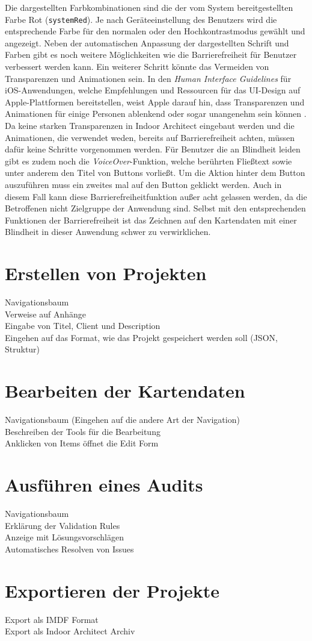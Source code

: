 Die dargestellten Farbkombinationen sind die der vom System bereitgestellten Farbe Rot (\texttt{systemRed}).
Je nach Geräteeinstellung des Benutzers wird die entsprechende Farbe für den normalen oder den Hochkontrastmodus gewählt und angezeigt.\pbreak%
%
Neben der automatischen Anpassung der dargestellten Schrift und Farben gibt es noch weitere Möglichkeiten wie die Barrierefreiheit für Benutzer verbessert werden kann.
Ein weiterer Schritt könnte das Vermeiden von Transparenzen und Animationen sein.
In den \emph{Human Interface Guidelines} für iOS-Anwendungen, welche Empfehlungen und Ressourcen für das UI-Design auf Apple-Plattformen bereitstellen, weist Apple darauf hin, dass Transparenzen und Animationen für einige Personen ablenkend oder sogar unangenehm sein können \parencite{APP2020a}.
Da keine starken Transparenzen in Indoor Architect eingebaut werden und die Animationen, die verwendet weden, bereits auf Barrierefreiheit achten, müssen dafür keine Schritte vorgenommen werden.
Für Benutzer die an Blindheit leiden gibt es zudem noch die \emph{VoiceOver}-Funktion, welche berührten Fließtext sowie unter anderem den Titel von Buttons vorließt.
Um die Aktion hinter dem Button auszuführen muss ein zweites mal auf den Button geklickt werden.
Auch in diesem Fall kann diese Barrierefreiheitfunktion außer acht gelassen werden, da die Betroffenen nicht Zielgruppe der Anwendung sind.
Selbst mit den entsprechenden Funktionen der Barrierefreiheit ist das Zeichnen auf den Kartendaten mit einer Blindheit in dieser Anwendung schwer zu verwirklichen.

\section{Erstellen von Projekten}
Navigationsbaum\\
Verweise auf Anhänge\\
Eingabe von Titel, Client und Description\\
Eingehen auf das Format, wie das Projekt gespeichert werden soll (JSON, Struktur)
\section{Bearbeiten der Kartendaten}
Navigationsbaum (Eingehen auf die andere Art der Navigation)\\
Beschreiben der Tools für die Bearbeitung\\
Anklicken von Items öffnet die Edit Form
\section{Ausführen eines Audits}
Navigationsbaum\\
Erklärung der Validation Rules\\
Anzeige mit Lösungsvorschlägen\\
Automatisches Resolven von Issues
\section{Exportieren der Projekte}
Export als IMDF Format\\
Export als Indoor Architect Archiv
